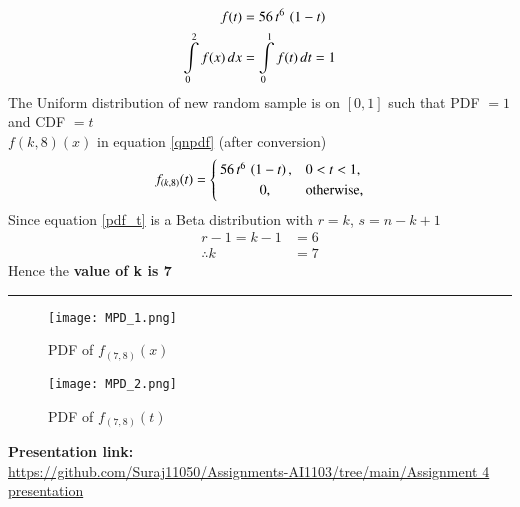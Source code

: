 \documentclass[journal,12pt,twocolumn]{IEEEtran}
\begin{document}
\begin{align}
f(t) &= 56\,t^{6}\,\left(1-t\right) \\
\int\limits_{0}^{2}f(x)\,dx &=  \int\limits_{0}^{1}f(t)\,dt = 1
\end{align}
The Uniform distribution of new random sample is on $[0,1]$ such that   PDF $= 1$ and CDF $= t$ \\
$f(k,8)(x)$ in equation \eqref{qnpdf}  (after conversion)
\begin{align}
f_{(k,8)}(t) =
  \begin{cases}
      56\,t^{6}\,\left(1-t\right),  & 0<t<1, \\ 
      \hspace{1cm}   0,               & \text{otherwise,} 
  \end{cases}
  \label{pdf_t}
\end{align}
Since equation \eqref{pdf_t} is a Beta distribution with $r=k$, $s=n-k+1$  
\begin{align}
r-1 = k-1 &= 6 \\
\therefore k &= 7 
\end{align}
Hence the \textbf{value of k is 7}
\vspace{0.5cm}
\hrule
\begin{figure}[htp]
    \centering
    \texttt{[image: MPD\_1.png]}
    \label{fig:maginal probability density 1}
    \caption{PDF of $f_{(7,8)}(x)$}
\centering
    \texttt{[image: MPD\_2.png]}
    \label{fig:maginal probability density 2}
    \caption{PDF of $f_{(7,8)}(t)$}
\end{figure}
\begin{center}
\textbf{Presentation link:} \\
\url{https://github.com/Suraj11050/Assignments-AI1103/tree/main/Assignment 4 presentation}
\end{center}
\end{document}

